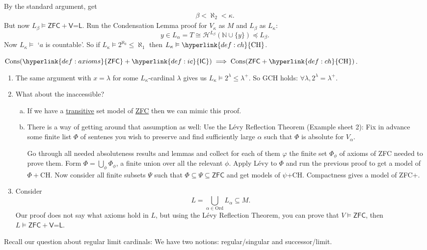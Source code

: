 \documentclass{article}
\newcommand{\1}{\mathbbm{1}}
\DeclareMathOperator{\cons}{Cons}
\let\models\vDash
\begin{document}
By the standard argument, get
\begin{align*}
  \beta < \aleph_2 < \kappa.
\end{align*}
But now $L_\beta \models \textsf{ZFC}+\textsf{V=L}$.
Run the Condensation Lemma proof for $V_\kappa$ as $M$ and $L_\beta$ as $L_\kappa$:
\begin{equation*}
  y \in L_\alpha = T \cong \mathcal{H}^{L_\beta}(\mathbb{N} \cup \{y\}) \preccurlyeq L_\beta.
\end{equation*}
Now $L_\kappa \models$ `$a$ is countable'. So if $L_\kappa \models 2^{\aleph_0} \leq \aleph_1$ then $L_\kappa \models \hyperlink{def:ch}{\text{CH}}$.
\begin{thm}
  $\cons(\hyperlink{def:axioms}{\textsf{ZFC}}+\hyperlink{def:ic}{\textsf{IC}}) \implies \cons(\textsf{ZFC}+\hyperlink{def:ch}{\text{CH}})$.
\end{thm}
\begin{remark}\leavevmode
  \begin{enumerate}[(1)]
    \item The same argument with $x=\lambda$ for some $L_\kappa$-cardinal $\lambda$ gives us $L_\kappa \models 2^\lambda \leq \lambda^+$. So GCH holds: $\forall \lambda, 2^\lambda = \lambda^+$.
    \item What about the inaccessible?
      \begin{enumerate}[(a)]
        \item If we have a \hyperlink{def:transitive}{transitive} set model of \hyperlink{def:axioms}{\textsf{ZFC}} then we can mimic this proof.
        \item There is a way of getting around that assumption as well:
          Use the L\'evy Reflection Theorem (Example sheet 2):
          Fix in advance some finite list $\Phi$ of sentenes you wish to preserve and find sufficiently large $\alpha$ such that $\Phi$ is absolute for $V_\alpha$.

          Go through all needed absoluteness results and lemmas and collect for each of them $\varphi$ the finite set $\Phi_\phi$ of axioms of \textsf{ZFC} needed to prove them. Form $\Phi = \bigcup_{\phi} \Phi_\phi$, a finite union over all the relevant $\phi$.
          Apply L\'evy to $\Phi$ and run the previous proof to get a model of $\Phi + \text{CH}$.
          Now consider all finite subsets $\Psi$ such that $\Phi \subseteq \Psi \subseteq \textsf{ZFC}$ and get models of $\psi$+CH.
          Compactness gives a model of \textsf{ZFC}+.
      \end{enumerate}
    \item Consider
      \begin{equation*}
        L = \bigcup_{\alpha \in \text{Ord}} L_\alpha \subseteq M.
      \end{equation*}
      Our proof does not say what axioms hold in $L$, but using the L\'evy Reflection Theorem, you can prove that $V \models \textsf{ZFC}$, then $L \models \textsf{ZFC}+\textsf{V=L}$.
  \end{enumerate}
\end{remark}
Recall our question about regular limit cardinals:
We have two notions: regular/singular and successor/limit.
\end{document}

